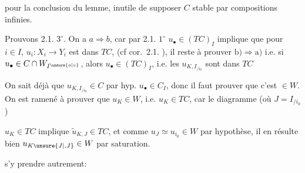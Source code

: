 
pour la conclusion du lemme, inutile de supposer $C$ stable par compositions infinies.

Prouvons 2.1. $3^\circ$. On a $a\Longrightarrow b$, car par 2.1. $1^\circ$\unsure{,|)} $u_\bullet\in(TC)_I$ implique que pour $i\in I$, $u_i:X_i\longrightarrow Y_i$ est dans $TC$,  (cf cor.\ 2.1. ),  il reste à prouver $\mathrm{b)}\Longrightarrow\mathrm{a)}$ i.e. si $u_\bullet\in C\cap W_{I^{\unsure{o|\circ}}}$, alors $u_\bullet\in(TC)_I$, i.e. les $u_{K,I_{/i_0}}$ sont dans $TC$ 

On sait déjà que $u_{K,I_{/i_0}}\in C$ par hyp. $u_\bullet\in C_I$, donc il faut prouver que c'est $\in W$. On est ramené à prouver que $u_K\in W$, i.e. $u_K\in TC$, car  le diagramme (où $J=I_{/i_0}$)


$u_K\in TC$ implique $\widetilde u_{K,J}\in TC$, et comme $u_J\simeq u_{i_0}\in W$ par hypothèse, il en résulte bien $u_{K\unsure{J|,J}}\in W$ par saturation. 

 s'y prendre autrement:


